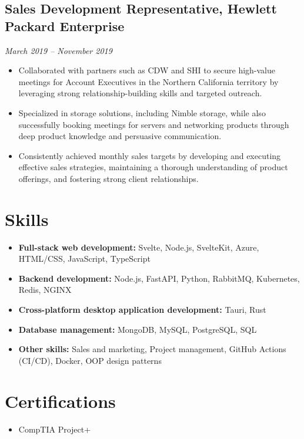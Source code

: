 \documentclass[a4paper,10pt]{article}
\begin{document}
\subsection*{Sales Development Representative, Hewlett Packard Enterprise}
\textit{March 2019 -- November 2019}
\begin{itemize}
    \item Collaborated with partners such as CDW and SHI to secure high-value meetings for Account Executives in the Northern California territory by leveraging strong relationship-building skills and targeted outreach.
    \item Specialized in storage solutions, including Nimble storage, while also successfully booking meetings for servers and networking products through deep product knowledge and persuasive communication.
    \item Consistently achieved monthly sales targets by developing and executing effective sales strategies, maintaining a thorough understanding of product offerings, and fostering strong client relationships.
\end{itemize}

\section*{Skills}
\begin{itemize}[leftmargin=0in, label={}]
    \item \textbf{Full-stack web development:} Svelte, Node.js, SvelteKit, Azure, HTML/CSS, JavaScript, TypeScript
    \item \textbf{Backend development:} Node.js, FastAPI, Python, RabbitMQ, Kubernetes, Redis, NGINX
    \item \textbf{Cross-platform desktop application development:} Tauri, Rust
    \item \textbf{Database management:} MongoDB, MySQL, PostgreSQL, SQL
    \item \textbf{Other skills:} Sales and marketing, Project management, GitHub Actions (CI/CD), Docker, OOP design patterns
\end{itemize}

\section*{Certifications}
\begin{itemize}[leftmargin=0in, label={}]
    \item CompTIA Project+
\end{itemize}
\end{document}
